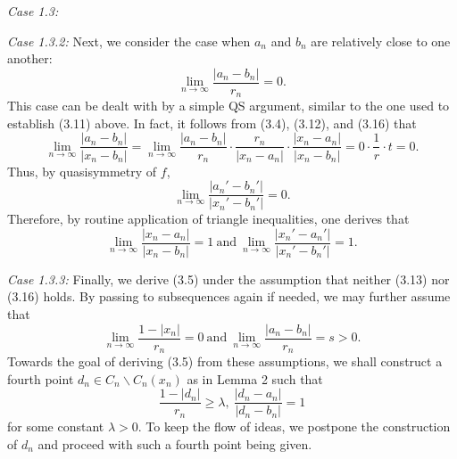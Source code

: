 \documentclass[11pt]{amsart}
\numberwithin{equation}{section}
\theoremstyle{plain}
\theoremstyle{step}
\newenvironment{case}[1]{\par\noindent\textit{Case #1:}}{\par}
\def\geq{\geqslant}
\begin{document}
\begin{case}{1.3}
\vspace{0.3cm}
\begin{case}{1.3.2} Next, we consider the case when $a_n$ and $b_n$ are relatively close to one another:
\begin{equation}
    \lim_{n\rightarrow\infty}\frac{|a_n-b_n| }{r_n} =0.
\end{equation}
This case can be dealt with by a simple QS argument, similar to the one used to establish (3.11) above. In fact, it follows from (3.4), (3.12), and (3.16) that 
$$\lim_{n\rightarrow\infty}\frac{|a_n-b_n|}{|x_n-b_n|}=\lim_{n\rightarrow\infty}\frac{|a_n-b_n|}{r_n}\cdot
\frac{r_n}{|x_n-a_n|}\cdot\frac{|x_n-a_n|}{|x_n-b_n|}=0\cdot\frac{1}{r}\cdot t=0.$$
Thus, by quasisymmetry of $f$,
$$\lim_{n\rightarrow\infty}\frac{|a_n'-b_n'|}{|x_n'-b_n'|}=0.$$
Therefore, by routine application of triangle inequalities, one derives that 
$$\lim_{n\rightarrow\infty}\frac{|x_n-a_n|}{|x_n-b_n|}=1 \ \text{and} \ 
\lim_{n\rightarrow\infty}\frac{|x_n'-a_n'|}{|x_n'-b_n'|}=1.$$
\end{case}

\vspace{0.3cm}
\begin{case}{1.3.3} Finally, we derive (3.5) under the assumption that neither (3.13) nor (3.16) holds. By passing to subsequences again if needed, we may further assume that 
\begin{equation}   
\lim_{n\rightarrow\infty}\frac{1-|x_n|}{r_n}=0 \ \text{and} \ 
\lim_{n\rightarrow\infty}\frac{|a_n-b_n| }{r_n} =s>0.
\end{equation}
Towards the goal of deriving (3.5) from these assumptions, we shall construct a fourth point $d_n\in C_n\backslash C_n(x_n)$ as in Lemma 2 such that 
\begin{equation}
\frac{1-|d_n|}{r_n}\geq\lambda, \ \frac{|d_n-a_n|}{|d_n-b_n|}=1
\end{equation}
for some constant $\lambda>0$. To keep the flow of ideas, we postpone the construction of $d_n$ and proceed with such a fourth point being given. 


\end{case}
\end{case}
\end{document}
